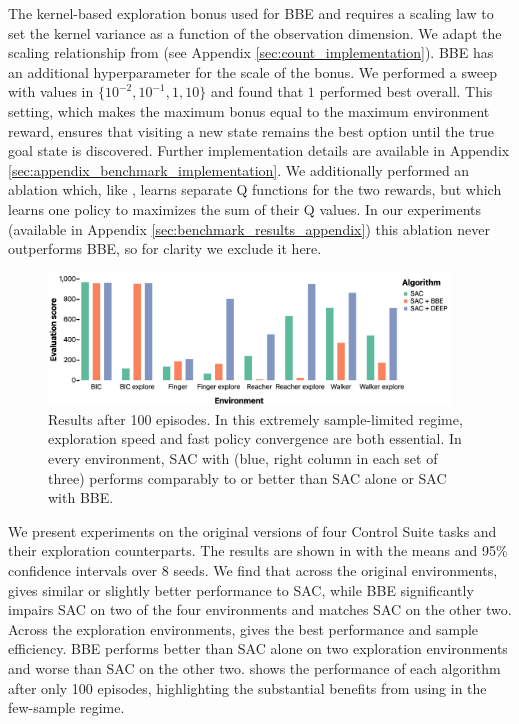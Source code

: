 The kernel-based exploration bonus used for BBE and \algshort{} requires a scaling law to set the kernel variance as a function of the observation dimension.
We adapt the scaling relationship from \citep{Henderson2012NormalRB} (see Appendix \ref{sec:count_implementation}).
BBE has an additional hyperparameter for the scale of the bonus.
We performed a sweep with values in $\{ 10^{-2}, 10^{-1}, 1, 10 \}$ and found that $1$ performed best overall.
This setting, which makes the maximum bonus equal to the maximum environment reward, ensures that visiting a new state remains the best option until the true goal state is discovered.
Further implementation details are available in Appendix \ref{sec:appendix_benchmark_implementation}.
We additionally performed an ablation which, like \algshort{}, learns separate Q functions for the two rewards, but which learns one policy to maximizes the sum of their Q values.
In our experiments (available in Appendix \ref{sec:benchmark_results_appendix}) this ablation never outperforms BBE, so for clarity we exclude it here.



\begin{figure}[ht]
    \centering
    \includegraphics[width=0.95\textwidth]{figures/deep/control_suite_summary_100.png}
    \caption{Results after 100 episodes. In this extremely sample-limited regime, exploration speed and fast policy convergence are both essential. In every environment, SAC with \algshort{} (blue, right column in each set of three) performs comparably to or better than SAC alone or SAC with BBE.}
    \label{fig:control_suite_summary}
\end{figure}

We present experiments on the original versions of four Control Suite tasks and their exploration counterparts.
The results are shown in  with the means and 95\% confidence intervals over 8 seeds.
We find that across the original environments, \algshort{} gives similar or slightly better performance to SAC, while BBE significantly impairs SAC on two of the four environments and matches SAC on the other two.
Across the exploration environments, \algshort{} gives the best performance and sample efficiency.
BBE performs better than SAC alone on two exploration environments and worse than SAC on the other two.
 shows the performance of each algorithm after only 100 episodes, highlighting the substantial benefits from using \algshort{} in the few-sample regime.




